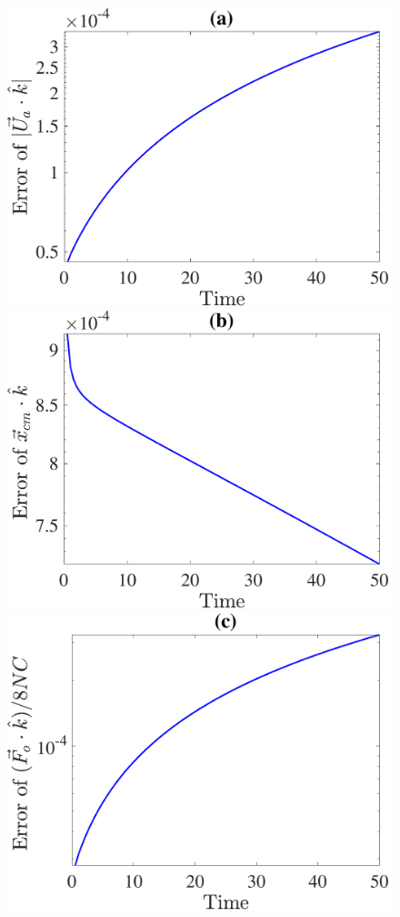 \begin{figure}[h]
	\begin{center}
		\includegraphics[scale=0.35]{./figures/fig_NC10_dt_err_Ua3_all}
		\includegraphics[scale=0.35]{./figures/fig_NC10_dt_err_cm3_all}
		\includegraphics[scale=0.35]{./figures/fig_NC10_dt_err_Fo3_all}

\end{center}
\end{figure}
